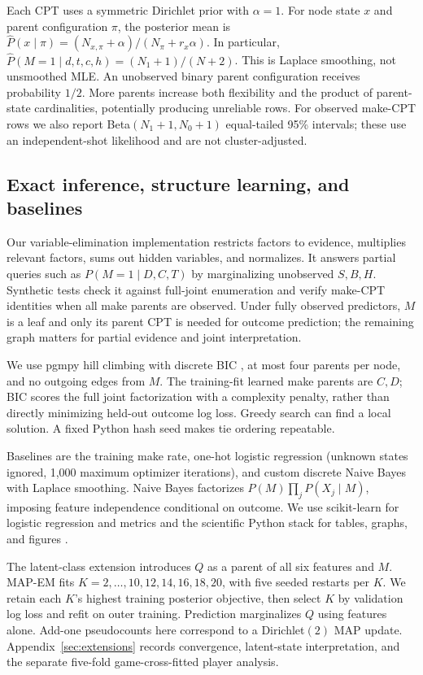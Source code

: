 \documentclass{article}
\begin{document}
Each CPT uses a symmetric Dirichlet prior with $\alpha=1$. For node state $x$
and parent configuration $\pi$, the posterior mean is
$\hat P(x\mid\pi)=(N_{x,\pi}+\alpha)/(N_\pi+r_x\alpha)$.
In particular, $\hat P(M=1\mid d,t,c,h)=(N_1+1)/(N+2)$.
This is Laplace smoothing, not unsmoothed MLE. An unobserved binary parent
configuration receives probability $1/2$. More parents increase both flexibility
and the product of parent-state cardinalities, potentially producing unreliable
rows. For observed make-CPT rows we also report Beta$(N_1+1,N_0+1)$ equal-tailed
95\% intervals; these use an independent-shot likelihood and are not cluster-adjusted.

\subsection{Exact inference, structure learning, and baselines}
Our variable-elimination implementation restricts factors to evidence, multiplies
relevant factors, sums out hidden variables, and normalizes. It answers partial
queries such as $P(M=1\mid D,C,T)$ by marginalizing unobserved $S,B,H$.
Synthetic tests check it against full-joint enumeration and verify make-CPT
identities when all make parents are observed. Under fully observed predictors,
$M$ is a leaf and only its parent CPT is needed for outcome prediction; the
remaining graph matters for partial evidence and joint interpretation.

We use pgmpy hill climbing \citep{pgmpy} with discrete BIC \citep{schwarz}, at most
four parents per node, and no outgoing edges from $M$. The training-fit learned
make parents are $C,D$; BIC scores the full joint factorization with a complexity
penalty, rather than directly minimizing held-out outcome log loss. Greedy search
can find a local solution. A fixed Python hash seed makes tie ordering repeatable.

Baselines are the training make rate, one-hot logistic regression (unknown states
ignored, 1,000 maximum optimizer iterations), and custom discrete Naive Bayes
with Laplace smoothing. Naive Bayes factorizes
$P(M)\prod_jP(X_j\mid M)$, imposing feature independence conditional on outcome.
We use scikit-learn for logistic regression and metrics \citep{sklearn} and the
scientific Python stack for tables, graphs, and figures \citep{software}.

The latent-class extension introduces $Q$ as a parent of all six
features and $M$. MAP-EM fits $K=2,\ldots,10,12,14,16,18,20$, with five seeded
restarts per $K$. We retain each $K$'s highest training posterior objective, then
select $K$ by validation log loss and refit on outer training. Prediction
marginalizes $Q$ using features alone. Add-one pseudocounts here correspond to
a Dirichlet$(2)$ MAP update. Appendix~\ref{sec:extensions} records convergence,
latent-state interpretation, and the separate five-fold game-cross-fitted
player analysis.
\end{document}
